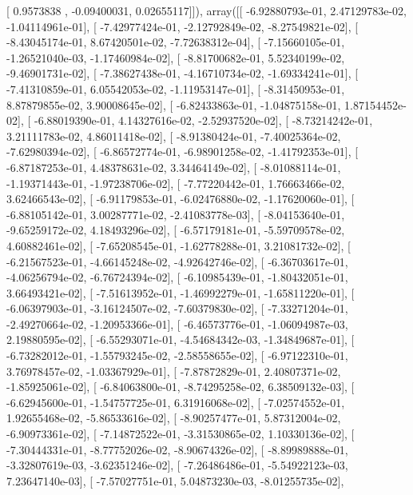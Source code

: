 \documentclass{article}
\begin{document}
       [ 0.9573838 , -0.09400031,  0.02655117]]), array([[ -6.92880793e-01,   2.47129783e-02,  -1.04114961e-01],
       [ -7.42977424e-01,  -2.12792849e-02,  -8.27549821e-02],
       [ -8.43045174e-01,   8.67420501e-02,  -7.72638312e-04],
       [ -7.15660105e-01,  -1.26521040e-03,  -1.17460984e-02],
       [ -8.81700682e-01,   5.52340199e-02,  -9.46901731e-02],
       [ -7.38627438e-01,  -4.16710734e-02,  -1.69334241e-01],
       [ -7.41310859e-01,   6.05542053e-02,  -1.11953147e-01],
       [ -8.31450953e-01,   8.87879855e-02,   3.90008645e-02],
       [ -6.82433863e-01,  -1.04875158e-01,   1.87154452e-02],
       [ -6.88019390e-01,   4.14327616e-02,  -2.52937520e-02],
       [ -8.73214242e-01,   3.21111783e-02,   4.86011418e-02],
       [ -8.91380424e-01,  -7.40025364e-02,  -7.62980394e-02],
       [ -6.86572774e-01,  -6.98901258e-02,  -1.41792353e-01],
       [ -6.87187253e-01,   4.48378631e-02,   3.34464149e-02],
       [ -8.01088114e-01,  -1.19371443e-01,  -1.97238706e-02],
       [ -7.77220442e-01,   1.76663466e-02,   3.62466543e-02],
       [ -6.91179853e-01,  -6.02476880e-02,  -1.17620060e-01],
       [ -6.88105142e-01,   3.00287771e-02,  -2.41083778e-03],
       [ -8.04153640e-01,  -9.65259172e-02,   4.18493296e-02],
       [ -6.57179181e-01,  -5.59709578e-02,   4.60882461e-02],
       [ -7.65208545e-01,  -1.62778288e-01,   3.21081732e-02],
       [ -6.21567523e-01,  -4.66145248e-02,  -4.92642746e-02],
       [ -6.36703617e-01,  -4.06256794e-02,  -6.76724394e-02],
       [ -6.10985439e-01,  -1.80432051e-01,   3.66493421e-02],
       [ -7.51613952e-01,  -1.46992279e-01,  -1.65811220e-01],
       [ -6.06397903e-01,  -3.16124507e-02,  -7.60379830e-02],
       [ -7.33271204e-01,  -2.49270664e-02,  -1.20953366e-01],
       [ -6.46573776e-01,  -1.06094987e-03,   2.19880595e-02],
       [ -6.55293071e-01,  -4.54684342e-03,  -1.34849687e-01],
       [ -6.73282012e-01,  -1.55793245e-02,  -2.58558655e-02],
       [ -6.97122310e-01,   3.76978457e-02,  -1.03367929e-01],
       [ -7.87872829e-01,   2.40807371e-02,  -1.85925061e-02],
       [ -6.84063800e-01,  -8.74295258e-02,   6.38509132e-03],
       [ -6.62945600e-01,  -1.54757725e-01,   6.31916068e-02],
       [ -7.02574552e-01,   1.92655468e-02,  -5.86533616e-02],
       [ -8.90257477e-01,   5.87312004e-02,  -6.90973361e-02],
       [ -7.14872522e-01,  -3.31530865e-02,   1.10330136e-02],
       [ -7.30444331e-01,  -8.77752026e-02,  -8.90674326e-02],
       [ -8.89989888e-01,  -3.32807619e-03,  -3.62351246e-02],
       [ -7.26486486e-01,  -5.54922123e-03,   7.23647140e-03],
       [ -7.57027751e-01,   5.04873230e-03,  -8.01255735e-02],
\end{document}
